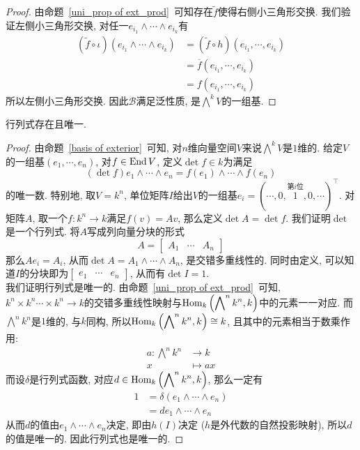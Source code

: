 \begin{proof}
    由命题~\ref{uni_prop of ext_prod}~可知存在$\widetilde{f}$使得右侧小三角形交换.
    我们验证左侧小三角形交换, 对任一$e_{i_1}\wedge\cdots\wedge e_{i_k}$有
    \begin{align*}
        (\widetilde{f}\circ\iota)(e_{i_1}\wedge\cdots\wedge e_{i_k})&=(\widetilde{f}\circ h)(e_{i_1},\cdots,e_{i_k})\\
        &=\overline{f}(e_{i_1},\cdots,e_{i_k})\\
        &=f(e_{i_1},\cdots,e_{i_k})
    \end{align*}
    所以左侧小三角形交换.
    因此$\mathcal{B}$满足泛性质, 是$\displaystyle\bigwedge\nolimits^k V$的一组基.
\end{proof}

\begin{prop}\label{exitstence and uniqueness of determinant}
    行列式存在且唯一.
\end{prop}
\begin{proof}
    由命题~\ref{basis of exterior}~可知, 对$n$维向量空间$V$来说$\displaystyle\bigwedge\nolimits^k V$是$1$维的.
    给定$V$的一组基$(e_1,\cdots,e_n)$, 对$f\in\operatorname{End}{V}$, 定义$\det{f}\in k$为满足
    \[(\det{f})e_1\wedge\cdots\wedge e_n=f(e_1)\wedge\cdots\wedge f(e_n)\]
    的唯一数.
    特别地, 取$V=k^n$, 单位矩阵$I$给出$V$的一组基$e_i=(\cdots,0,\stackrel{\text{第}i\text{位}}{1},0,\cdots)^\top$.
    对矩阵$A$, 取一个$f:k^n\to k$满足$f(v)=Av$, 那么定义$\det{A}=\det{f}$.
    我们证明$\det$是一个行列式.
    将$A$写成列向量分块的形式
    \[A=\left[\begin{array}{c|c|c}A_1 & \cdots & A_n\end{array}\right]\]
    那么$Ae_i=A_i$, 从而$\det{A}=A_1\wedge\cdots\wedge A_n$, 是交错多重线性的.
    同时由定义, 可以知道$I$的分块即为$\left[\begin{array}{c|c|c}e_1 & \cdots & e_n\end{array}\right]$, 从而有$\det{I}=1$.\\
    我们证明行列式是唯一的.
    由命题~\ref{uni_prop of ext_prod}~可知, $k^n\times k^n\cdots\times k^n\to k$的交错多重线性映射与$\displaystyle\operatorname{Hom}_k\left(\bigwedge\nolimits^n k^n,k\right)$中的元素一一对应.
    而$\displaystyle\bigwedge\nolimits^n k^n$是$1$维的, 与$k$同构, 所以$\displaystyle\operatorname{Hom}_k\left(\bigwedge\nolimits^n k^n,k\right)\cong k$, 且其中的元素相当于数乘作用:
    \begin{align*}
        a:\bigwedge\nolimits^n k^n&\to k\\
        x&\mapsto ax
    \end{align*}
    而设$\delta$是行列式函数, 对应$d\in\displaystyle\operatorname{Hom}_k\left(\bigwedge\nolimits^n k^n,k\right)$, 那么一定有
    \begin{align*}
        1&=\delta(e_1\wedge\cdots\wedge e_n)\\
        &=de_1\wedge\cdots\wedge e_n
    \end{align*}
    从而$d$的值由$e_1\wedge\cdots\wedge e_n$决定, 即由$h(I)$决定 ($h$是外代数的自然投影映射), 所以$d$的值是唯一的.
    因此行列式也是唯一的.
\end{proof}

